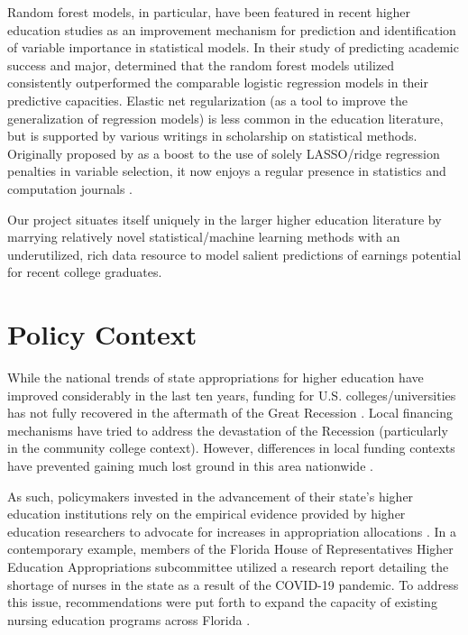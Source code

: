 \documentclass[a4paper, 12pt]{article}
\begin{document}
Random forest models, in particular, have been featured in recent
higher education studies as an improvement mechanism for prediction
and identification of variable importance in statistical models. In
their study of predicting academic success and major,
\textcite{beaulacrosenthal_2019} determined that the random forest
models utilized consistently outperformed the comparable logistic
regression models in their predictive capacities. Elastic net
regularization (as a tool to improve the generalization of regression
models) is less common in the education literature, but is supported
by various writings in scholarship on statistical methods. Originally
proposed by \textcite{zouhastie_2005} as a boost to the use of solely
LASSO/ridge regression penalties in variable selection, it now enjoys
a regular presence in statistics and computation journals
\parencite{zouzhang_2009, lilin_2010}.

Our project situates itself uniquely in the larger higher education
literature by marrying relatively novel statistical/machine learning
methods with an underutilized, rich data resource to model salient
predictions of earnings potential for recent college graduates.

\section*{Policy Context}

While the national trends of state appropriations for higher education
have improved considerably in the last ten years, funding for
U.S. colleges/universities has not fully recovered in the aftermath of
the Great Recession \parencite{shef_2021}. Local financing mechanisms
have tried to address the devastation of the Recession (particularly
in the community college context). However, differences in local
funding contexts have prevented gaining much lost ground in this area
nationwide \parencite{dowdgrant_2006, cap_2020}.

As such, policymakers invested in the advancement of their state's
higher education institutions rely on the empirical evidence provided
by higher education researchers to advocate for increases in
appropriation allocations \parencite{terenzini_1996}. In a
contemporary example, members of the Florida House of Representatives
Higher Education Appropriations subcommittee utilized a research
report detailing the shortage of nurses in the state as a result of
the COVID-19 pandemic. To address this issue, recommendations were put
forth to expand the capacity of existing nursing education programs
across Florida \parencite{floridahouse_2022, workforce_2021}.
\end{document}

